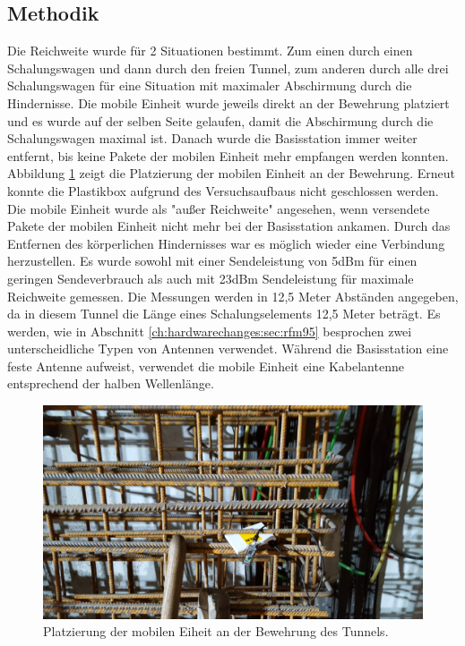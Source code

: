 \subsection{Methodik} 
Die Reichweite wurde für 2 Situationen bestimmt.
Zum einen durch einen Schalungswagen und dann durch den freien Tunnel, zum anderen durch alle drei Schalungswagen für eine Situation mit maximaler Abschirmung durch die Hindernisse.
Die mobile Einheit wurde jeweils direkt an der Bewehrung platziert und es wurde auf der selben Seite gelaufen, damit die Abschirmung durch die Schalungswagen maximal ist.
Danach wurde die Basisstation immer weiter entfernt, bis keine Pakete der mobilen Einheit mehr empfangen werden konnten.
Abbildung \ref{fig:lorabasis} zeigt die Platzierung der mobilen Einheit an der Bewehrung.
Erneut konnte die Plastikbox aufgrund des Versuchsaufbaus nicht geschlossen werden.
Die mobile Einheit wurde als "außer Reichweite" angesehen, wenn versendete Pakete der mobilen Einheit nicht mehr bei der Basisstation ankamen.
Durch das Entfernen des körperlichen Hindernisses war es möglich wieder eine Verbindung herzustellen.
Es wurde sowohl mit einer Sendeleistung von 5dBm für einen geringen Sendeverbrauch als auch mit 23dBm Sendeleistung für maximale Reichweite gemessen.
Die Messungen werden in 12,5 Meter Abständen angegeben, da in diesem Tunnel die Länge eines Schalungselements 12,5 Meter beträgt.
Es werden, wie in Abschnitt \ref{ch:hardwarechanges:sec:rfm95} besprochen zwei unterscheidliche Typen von Antennen verwendet. 
Während die Basisstation eine feste Antenne aufweist, verwendet die mobile Einheit eine Kabelantenne entsprechend der halben Wellenlänge. 

\begin{figure}[h]
  \centering
	\includegraphics[width=\textwidth]{images/lorabasis.jpg}
  \caption{Platzierung der mobilen Eiheit an der Bewehrung des Tunnels.}
  \label{fig:lorabasis}
\end{figure}

